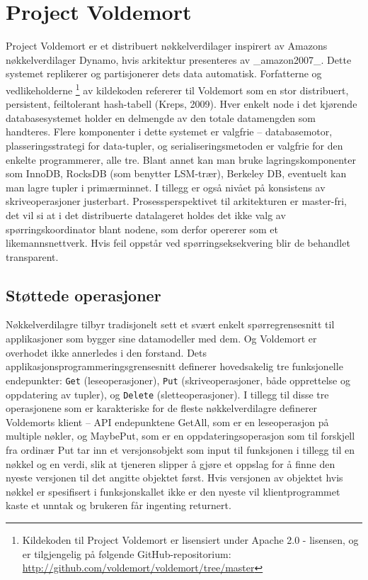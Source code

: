 \section{Project Voldemort}

Project Voldemort er et distribuert nøkkelverdilager inspirert av Amazons nøkkelverdilager Dynamo, hvis arkitektur presenteres av _amazon2007_. Dette systemet replikerer og partisjonerer dets data automatisk. Forfatterne og vedlikeholderne \footnote{Kildekoden til Project Voldemort er lisensiert under Apache 2.0 - lisensen, og er tilgjengelig på følgende GitHub-repositorium: \url{http://github.com/voldemort/voldemort/tree/master}} av kildekoden refererer til Voldemort som en stor distribuert, persistent, feiltolerant hash-tabell (Kreps, 2009). Hver enkelt node i det kjørende databasesystemet holder en delmengde av den totale datamengden som handteres. Flere komponenter i dette systemet er valgfrie – databasemotor, plasseringsstrategi for data-tupler, og serialiseringsmetoden er valgfrie for den enkelte programmerer, alle tre. Blant annet kan man bruke lagringskomponenter som InnoDB, RocksDB (som benytter LSM-trær), Berkeley DB, eventuelt kan man lagre tupler i primærminnet. I tillegg er også nivået på konsistens av skriveoperasjoner justerbart. Prosessperspektivet til arkitekturen er master-fri, det vil si at i det distribuerte datalageret holdes det ikke valg av spørringskoordinator blant nodene, som derfor opererer som et likemannsnettverk. Hvis feil oppstår ved spørringseksekvering blir de behandlet transparent.

\subsection{Støttede operasjoner}
Nøkkelverdilagre tilbyr tradisjonelt sett et svært enkelt spørregrensesnitt til applikasjoner som bygger sine datamodeller med dem. Og Voldemort er overhodet ikke annerledes i den forstand. Dets applikasjonsprogrammeringsgrensesnitt definerer hovedsakelig tre funksjonelle endepunkter: \texttt{Get} (leseoperasjoner), \texttt{Put} (skriveoperasjoner, både opprettelse og oppdatering av tupler), og \texttt{Delete} (sletteoperasjoner). I tillegg til disse tre operasjonene som er karakteriske for de fleste nøkkelverdilagre definerer Voldemorts klient – API endepunktene GetAll, som er en leseoperasjon på multiple nøkler, og MaybePut, som er en oppdateringsoperasjon som til forskjell fra ordinær Put tar inn et versjonsobjekt som input til funksjonen i tillegg til en nøkkel og en verdi, slik at tjeneren slipper å gjøre et oppslag for å finne den nyeste versjonen til det angitte objektet først. Hvis versjonen av objektet hvis nøkkel er spesifisert i funksjonskallet ikke er den nyeste vil klientprogrammet kaste et unntak og brukeren får ingenting returnert.
	
